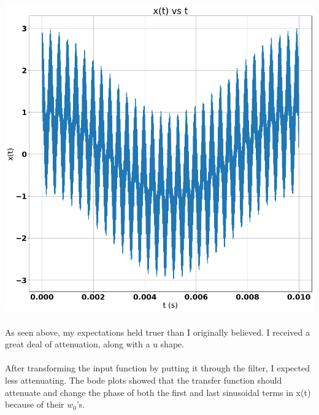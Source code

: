 \documentclass[12pt]{report}
\begin{document}
    \includegraphics[scale=0.25]{Figure 2022-03-29 221910 (3).png}
    
    \paragraph{} As seen above, my expectations held truer than I originally believed. I received a great deal of attenuation, along with a u shape. 
    
    \paragraph{} After transforming the input function by putting it through the filter, I expected less attenuating. The bode plots showed that the transfer function should attenuate and change the phase of both the first and last sinusoidal terms in x(t) because of their $w_0$'s. 
    
\end{document}
